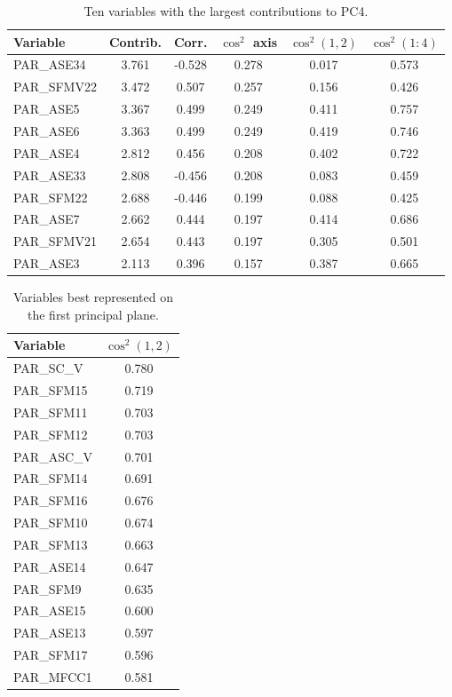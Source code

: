 \begin{table}[H]
\centering
\caption{Ten variables with the largest contributions to PC4.}
\label{tab:pca_pc4_variables}
\scriptsize

\begin{tabular}{lccccc}
\toprule
Variable & Contrib. & Corr. & \(\cos^2\) axis & \(\cos^2(1,2)\) & \(\cos^2(1{:}4)\) \\
\midrule
PAR\_ASE34 & 3.761 & -0.528 & 0.278 & 0.017 & 0.573 \\
PAR\_SFMV22 & 3.472 &  0.507 & 0.257 & 0.156 & 0.426 \\
PAR\_ASE5 & 3.367 &  0.499 & 0.249 & 0.411 & 0.757 \\
PAR\_ASE6 & 3.363 &  0.499 & 0.249 & 0.419 & 0.746 \\
PAR\_ASE4 & 2.812 &  0.456 & 0.208 & 0.402 & 0.722 \\
PAR\_ASE33 & 2.808 & -0.456 & 0.208 & 0.083 & 0.459 \\
PAR\_SFM22 & 2.688 & -0.446 & 0.199 & 0.088 & 0.425 \\
PAR\_ASE7 & 2.662 &  0.444 & 0.197 & 0.414 & 0.686 \\
PAR\_SFMV21 & 2.654 &  0.443 & 0.197 & 0.305 & 0.501 \\
PAR\_ASE3 & 2.113 &  0.396 & 0.157 & 0.387 & 0.665 \\
\bottomrule
\end{tabular}
\end{table}

\begin{table}[H]
\centering
\caption{Variables best represented on the first principal plane.}
\label{tab:pca_best_plane12}
\scriptsize
\begin{tabular}{lc}
\toprule
Variable & \(\cos^2(1,2)\) \\
\midrule
PAR\_SC\_V & 0.780 \\
PAR\_SFM15 & 0.719 \\
PAR\_SFM11 & 0.703 \\
PAR\_SFM12 & 0.703 \\
PAR\_ASC\_V & 0.701 \\
PAR\_SFM14 & 0.691 \\
PAR\_SFM16 & 0.676 \\
PAR\_SFM10 & 0.674 \\
PAR\_SFM13 & 0.663 \\
PAR\_ASE14 & 0.647 \\
PAR\_SFM9 & 0.635 \\
PAR\_ASE15 & 0.600 \\
PAR\_ASE13 & 0.597 \\
PAR\_SFM17 & 0.596 \\
PAR\_MFCC1 & 0.581 \\
\bottomrule
\end{tabular}
\end{table}

